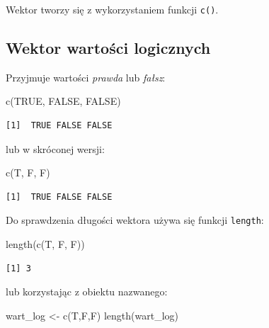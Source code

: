 \documentclass[
  letterpaper,
  DIV=11,
  numbers=noendperiod]{scrreprt}
\newenvironment{Shaded}{\begin{snugshade}}{\end{snugshade}}
\newcommand{\ConstantTok}[1]{\textcolor[rgb]{0.56,0.35,0.01}{#1}}
\newcommand{\FunctionTok}[1]{\textcolor[rgb]{0.28,0.35,0.67}{#1}}
\newcommand{\NormalTok}[1]{\textcolor[rgb]{0.00,0.23,0.31}{#1}}
\newcommand{\OtherTok}[1]{\textcolor[rgb]{0.00,0.23,0.31}{#1}}
\begin{document}
Wektor tworzy się z wykorzystaniem funkcji \texttt{c()}.

\hypertarget{wektor-wartoux15bci-logicznych}{%
\subsection{Wektor wartości
logicznych}\label{wektor-wartoux15bci-logicznych}}

Przyjmuje wartości \emph{prawda} lub \emph{fałsz}:

\begin{Shaded}
\begin{Highlighting}[]
\FunctionTok{c}\NormalTok{(}\ConstantTok{TRUE}\NormalTok{, }\ConstantTok{FALSE}\NormalTok{, }\ConstantTok{FALSE}\NormalTok{)}
\end{Highlighting}
\end{Shaded}

\begin{verbatim}
[1]  TRUE FALSE FALSE
\end{verbatim}

lub w skróconej wersji:

\begin{Shaded}
\begin{Highlighting}[]
\FunctionTok{c}\NormalTok{(T, F, F)}
\end{Highlighting}
\end{Shaded}

\begin{verbatim}
[1]  TRUE FALSE FALSE
\end{verbatim}

Do sprawdzenia długości wektora używa się funkcji \texttt{length}:

\begin{Shaded}
\begin{Highlighting}[]
\FunctionTok{length}\NormalTok{(}\FunctionTok{c}\NormalTok{(T, F, F))}
\end{Highlighting}
\end{Shaded}

\begin{verbatim}
[1] 3
\end{verbatim}

lub korzystając z obiektu nazwanego:

\begin{Shaded}
\begin{Highlighting}[]
\NormalTok{wart\_log }\OtherTok{\textless{}{-}} \FunctionTok{c}\NormalTok{(T,F,F)}
\FunctionTok{length}\NormalTok{(wart\_log)}
\end{Highlighting}
\end{Shaded}
\end{document}

